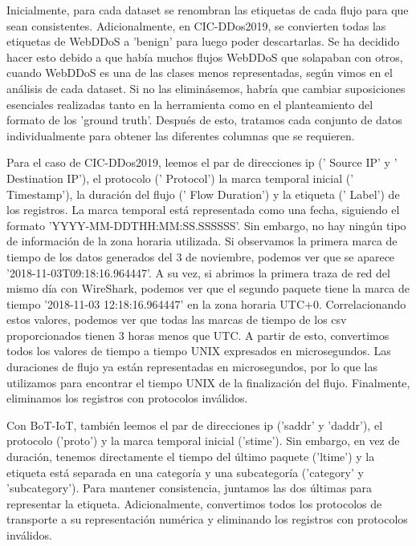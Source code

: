 Inicialmente, para cada dataset se renombran las etiquetas de cada flujo para que sean consistentes. Adicionalmente, en CIC-DDos2019, se convierten todas las etiquetas de WebDDoS a 'benign' para luego poder descartarlas. Se ha decidido hacer esto debido a que había muchos flujos WebDDoS que solapaban con otros, cuando WebDDoS es una de las clases menos representadas, según vimos en el análisis de cada dataset. Si no las eliminásemos, habría que cambiar suposiciones esenciales realizadas tanto en la herramienta como en el planteamiento del formato de los 'ground truth'. Después de esto, tratamos cada conjunto de datos individualmente para obtener las diferentes columnas que se requieren.

Para el caso de CIC-DDos2019, leemos el par de direcciones \acrshort{ip} (' Source IP' y ' Destination IP'), el protocolo (' Protocol') la marca temporal inicial (' Timestamp'), la duración del flujo (' Flow Duration') y la etiqueta (' Label') de los registros. La marca temporal está representada como una fecha, siguiendo el formato 'YYYY-MM-DDTHH:MM:SS.SSSSSS'. Sin embargo, no hay ningún tipo de información de la zona horaria utilizada. Si observamos la primera marca de tiempo de los datos generados del 3 de noviembre, podemos ver que se aparece '2018-11-03T09:18:16.964447'. A su vez, si abrimos la primera traza de red del mismo día con WireShark, podemos ver que el segundo paquete tiene la marca de tiempo '2018-11-03 12:18:16.964447' en la zona horaria UTC+0. Correlacionando estos valores, podemos ver que todas las marcas de tiempo de los \acrshort{csv} proporcionados tienen 3 horas menos que UTC. A partir de esto, convertimos todos los valores de tiempo a tiempo UNIX expresados en microsegundos. Las duraciones de flujo ya están representadas en microsegundos, por lo que las utilizamos para encontrar el tiempo UNIX de la finalización del flujo. Finalmente, eliminamos los registros con protocolos inválidos.

Con BoT-IoT, también leemos el par de direcciones \acrshort{ip} ('saddr' y 'daddr'), el protocolo ('proto') y la marca temporal inicial ('stime'). Sin embargo, en vez de duración, tenemos directamente el tiempo del último paquete ('ltime') y la etiqueta está separada en una categoría y una subcategoría ('category' y 'subcategory'). Para mantener consistencia, juntamos las dos últimas para representar la etiqueta. Adicionalmente, convertimos todos los protocolos de transporte a su representación numérica y eliminando los registros con protocolos inválidos.

